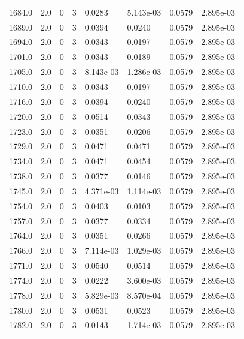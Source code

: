 \documentclass[preview]{standalone}
\begin{document}
{{{{{{{{{{{\begin{tabular}{L{1.2cm}C{1.2cm} C{0.3cm}C{0.5cm} C{1.4cm}C{1.4cm} C{1.4cm}C{1.4cm}}
  1684.0  &   2.0  & 0     &  3 &  0.0283  & 5.143e-03  & 0.0579 &  2.895e-03   \\ 
  1689.0  &   2.0  & 0     &  3 &  0.0394  & 0.0240  & 0.0579 &  2.895e-03   \\ 
  1694.0  &   2.0  & 0     &  3 &  0.0343  & 0.0197  & 0.0579 &  2.895e-03   \\ 
  1701.0  &   2.0  & 0     &  3 &  0.0343  & 0.0189  & 0.0579 &  2.895e-03   \\ 
  1705.0  &   2.0  & 0     &  3 &  8.143e-03  & 1.286e-03  & 0.0579 &  2.895e-03   \\ 
  1710.0  &   2.0  & 0     &  3 &  0.0343  & 0.0197  & 0.0579 &  2.895e-03   \\ 
  1716.0  &   2.0  & 0     &  3 &  0.0394  & 0.0240  & 0.0579 &  2.895e-03   \\ 
  1720.0  &   2.0  & 0     &  3 &  0.0514  & 0.0343  & 0.0579 &  2.895e-03   \\ 
  1723.0  &   2.0  & 0     &  3 &  0.0351  & 0.0206  & 0.0579 &  2.895e-03   \\ 
  1729.0  &   2.0  & 0     &  3 &  0.0471  & 0.0471  & 0.0579 &  2.895e-03   \\ 
  1734.0  &   2.0  & 0     &  3 &  0.0471  & 0.0454  & 0.0579 &  2.895e-03   \\ 
  1738.0  &   2.0  & 0     &  3 &  0.0377  & 0.0146  & 0.0579 &  2.895e-03   \\ 
  1745.0  &   2.0  & 0     &  3 &  4.371e-03  & 1.114e-03  & 0.0579 &  2.895e-03   \\ 
  1754.0  &   2.0  & 0     &  3 &  0.0403  & 0.0103  & 0.0579 &  2.895e-03   \\ 
  1757.0  &   2.0  & 0     &  3 &  0.0377  & 0.0334  & 0.0579 &  2.895e-03   \\ 
  1764.0  &   2.0  & 0     &  3 &  0.0351  & 0.0266  & 0.0579 &  2.895e-03   \\ 
  1766.0  &   2.0  & 0     &  3 &  7.114e-03  & 1.029e-03  & 0.0579 &  2.895e-03   \\ 
  1771.0  &   2.0  & 0     &  3 &  0.0540  & 0.0514  & 0.0579 &  2.895e-03   \\ 
  1774.0  &   2.0  & 0     &  3 &  0.0222  & 3.600e-03  & 0.0579 &  2.895e-03   \\ 
  1778.0  &   2.0  & 0     &  3 &  5.829e-03  & 8.570e-04  & 0.0579 &  2.895e-03   \\ 
  1780.0  &   2.0  & 0     &  3 &  0.0531  & 0.0523  & 0.0579 &  2.895e-03   \\ 
  1782.0  &   2.0  & 0     &  3 &  0.0143  & 1.714e-03  & 0.0579 &  2.895e-03   \\ 

\end{tabular}}}}}}}}}}}}
\end{document}
